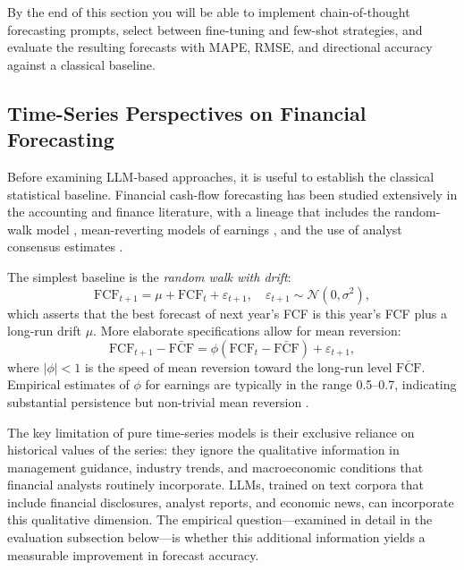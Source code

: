\begin{deepdive}
By the end of this section you will be able to implement chain-of-thought forecasting
prompts, select between fine-tuning and few-shot strategies, and evaluate the resulting
forecasts with MAPE, RMSE, and directional accuracy against a classical baseline.

\subsection{Time-Series Perspectives on Financial Forecasting}
\label{subsec:bv-forecasting-timeseries}

Before examining LLM-based approaches, it is useful to establish the classical
statistical baseline. Financial cash-flow forecasting has been studied extensively in
the accounting and finance literature, with a lineage that includes the random-walk
model \cite{ball1972earnings},
mean-reverting models of earnings \cite{fama2000forecasting},
and the use of analyst consensus estimates \cite{lewellen2010empirical}.

The simplest baseline is the \emph{random walk with drift}:
\begin{equation}
\label{eq:rw-fcf}
\mathrm{FCF}_{t+1} = \mu + \mathrm{FCF}_t + \varepsilon_{t+1},
\quad \varepsilon_{t+1} \sim \mathcal{N}(0, \sigma^2),
\end{equation}
which asserts that the best forecast of next year's FCF is this year's FCF plus a
long-run drift $\mu$. More elaborate specifications allow for mean reversion:
\begin{equation}
\label{eq:mean-reversion}
\mathrm{FCF}_{t+1} - \bar{\mathrm{FCF}} = \phi (\mathrm{FCF}_t - \bar{\mathrm{FCF}}) + \varepsilon_{t+1},
\end{equation}
where $|\phi| < 1$ is the speed of mean reversion toward the long-run level $\bar{\mathrm{FCF}}$.
Empirical estimates of $\phi$ for earnings are typically in the range 0.5--0.7,
indicating substantial persistence but non-trivial mean reversion \cite{fama2000forecasting}.

The key limitation of pure time-series models is their exclusive reliance on
historical values of the series: they ignore the qualitative information in
management guidance, industry trends, and macroeconomic conditions that financial
analysts routinely incorporate. LLMs, trained on text corpora that include financial
disclosures, analyst reports, and economic news, can incorporate this qualitative
dimension. The empirical question---examined in detail in the evaluation subsection
below---is whether this additional information yields a measurable improvement in
forecast accuracy.


\end{deepdive}
